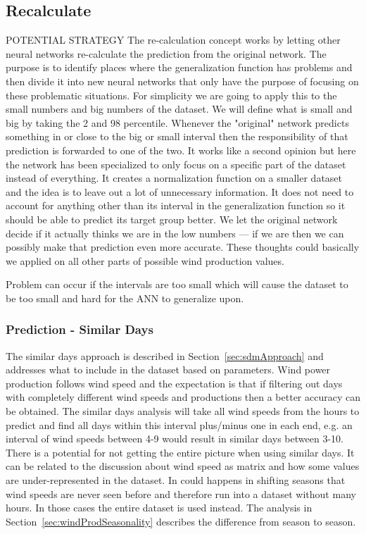 

\subsection{Recalculate}
POTENTIAL STRATEGY
The re-calculation concept works by letting other neural networks re-calculate the prediction from the original network. The purpose is to identify places where the generalization function has problems and then divide it into new neural networks that only have the purpose of focusing on these problematic situations. For simplicity we are going to apply this to the small numbers and big numbers of the dataset. We will define what is small and big by taking the 2 and 98 percentile. Whenever the "original" network predicts something in or close to the big or small interval then the responsibility of that prediction is forwarded to one of the two. It works like a second opinion but here the network has been specialized to only focus on a specific part of the dataset instead of everything. It creates a normalization function on a smaller dataset and the idea is to leave out a lot of unnecessary information. It does not need to account for anything other than its interval in the generalization function so it should be able to predict its target group better. We let the original network decide if it actually thinks we are in the low numbers --- if we are then we can possibly make that prediction even more accurate. These thoughts could basically we applied on all other parts of possible wind production values. 

Problem can occur if the intervals are too small which will cause the dataset to be too small and hard for the ANN to generalize upon.

\subsubsection{Prediction - Similar Days}
The similar days approach is described in Section~\ref{sec:sdmApproach} and addresses what to include in the dataset based on parameters. Wind power production follows wind speed and the expectation is that if filtering out days with completely different wind speeds and productions then a better accuracy can be obtained. The similar days analysis will take all wind speeds from the hours to predict and find all days within this interval plus/minus one in each end, e.g. an interval of wind speeds between 4-9 would result in similar days between 3-10. There is a potential for not getting the entire picture when using similar days. It can be related to the discussion about wind speed as matrix and how some values are under-represented in the dataset. In could happens in shifting seasons that wind speeds are never seen before and therefore run into a dataset without many hours. In those cases the entire dataset is used instead. The analysis in Section~\ref{sec:windProdSeasonality} describes the difference from season to season.


